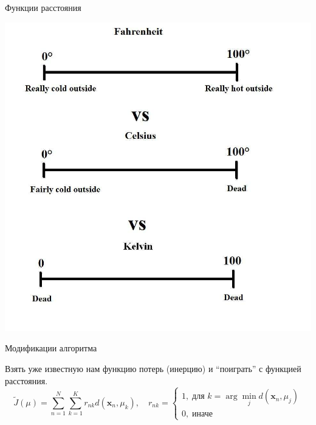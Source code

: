 \documentclass[aspectratio=169]{beamer}
\begin{document}
\begin{frame}

\begin{center}
{\Large Функции расстояния}

\vspace{1em}
\includegraphics[height=0.8\textheight]{images/celsius.jpg}
\end{center}

\end{frame}

\begin{frame}{Модификации алгоритма}

Взять уже известную нам функцию потерь (инерцию) и ``поиграть'' с функцией расстояния.
\[
\tilde J(\mu) = \sum_{n=1}^N \sum_{k=1}^K r_{nk} d(\mathbf{x}_n, \mu_k), \quad r_{nk} = \begin{cases}
1, \; \text{для } k = \arg \min_j d(\mathbf{x}_n, \mu_j) \\
0, \; \text{иначе}
\end{cases}
\]
\end{frame}
\end{document}
